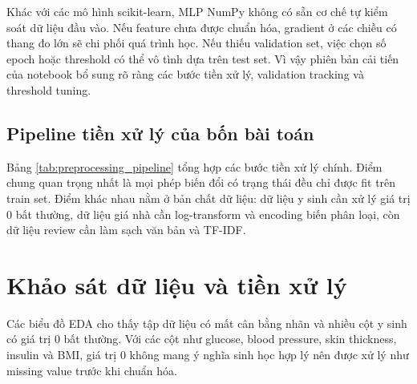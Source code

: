 \documentclass[12pt,a4paper]{report}
\begin{document}
Khác với các mô hình scikit-learn, MLP NumPy không có sẵn cơ chế tự kiểm soát dữ liệu đầu vào.
Nếu feature chưa được chuẩn hóa, gradient ở các chiều có thang đo lớn sẽ chi phối quá trình học.
Nếu thiếu validation set, việc chọn số epoch hoặc threshold có thể vô tình dựa trên test set.
Vì vậy phiên bản cải tiến của notebook bổ sung rõ ràng các bước tiền xử lý, validation tracking và threshold tuning.

\subsection{Pipeline tiền xử lý của bốn bài toán}
Bảng \ref{tab:preprocessing_pipeline} tổng hợp các bước tiền xử lý chính.
Điểm chung quan trọng nhất là mọi phép biến đổi có trạng thái đều chỉ được fit trên train set.
Điểm khác nhau nằm ở bản chất dữ liệu: dữ liệu y sinh cần xử lý giá trị 0 bất thường, dữ liệu giá nhà cần log-transform và encoding biến phân loại, còn dữ liệu review cần làm sạch văn bản và TF-IDF.

\begin{table}[H]
\centering
\caption{Pipeline tiền xử lý theo từng bài toán}
\label{tab:preprocessing_pipeline}
\end{table}

\section{Khảo sát dữ liệu và tiền xử lý}
Các biểu đồ EDA cho thấy tập dữ liệu có mất cân bằng nhãn và nhiều cột y sinh có giá trị 0 bất thường. Với các cột như glucose, blood pressure, skin thickness, insulin và BMI, giá trị 0 không mang ý nghĩa sinh học hợp lý nên được xử lý như missing value trước khi chuẩn hóa.
\end{document}

